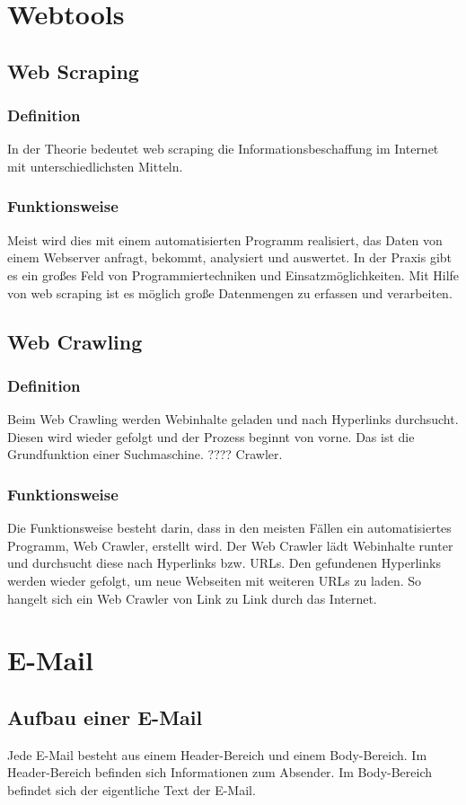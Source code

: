 \section{Webtools}
\subsection{Web Scraping}
\subsubsection{Definition}
In der Theorie bedeutet web scraping die Informationsbeschaffung im Internet mit unterschiedlichsten Mitteln. \cite{WebScraping}
\subsubsection{Funktionsweise}
Meist wird dies mit einem automatisierten Programm realisiert, das Daten von einem Webserver anfragt, bekommt, analysiert und auswertet. 
In der Praxis gibt es ein großes Feld von Programmiertechniken und Einsatzmöglichkeiten.
Mit Hilfe von web scraping ist es möglich große Datenmengen zu erfassen und verarbeiten.\cite{WebScraping}

\subsection{Web Crawling}
\subsubsection{Definition}
Beim Web Crawling werden Webinhalte geladen und nach Hyperlinks durchsucht. Diesen wird wieder gefolgt und der Prozess beginnt von vorne. Das ist die Grundfunktion einer Suchmaschine. ???? Crawler.\cite{WebScraping}
\subsubsection{Funktionsweise}
Die Funktionsweise besteht darin, dass in den meisten Fällen ein automatisiertes Programm, Web Crawler, erstellt wird. Der Web Crawler lädt Webinhalte runter und durchsucht diese nach Hyperlinks bzw. URLs. Den gefundenen Hyperlinks werden wieder gefolgt, um neue Webseiten mit weiteren URLs zu laden. So hangelt sich ein Web Crawler von Link zu Link durch das Internet.\cite{WebScraping}
\section{E-Mail}
\subsection{Aufbau einer E-Mail}
Jede E-Mail besteht aus einem Header-Bereich und einem Body-Bereich. Im Header-Bereich befinden sich Informationen zum Absender. Im Body-Bereich befindet sich der eigentliche Text der E-Mail.

